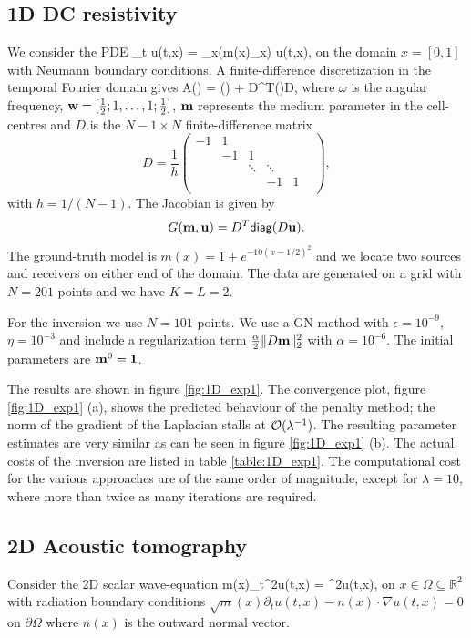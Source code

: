 \documentclass{iopart}
\begin{document}
\subsection{1D DC resistivity}
We consider the PDE
\bq
\partial_t u(t,x) = \partial_x\left(m(x)\partial_x\right) u(t,x),
\eq
on the domain $x = [0,1]$ with Neumann boundary conditions. 
A finite-difference discretization in the temporal Fourier domain gives
\bq
A() = \imath\omega{}() + D^T()D,
\eq
where $\omega$ is the angular frequency, $\mathbf{w} = [\frac{1}{2}; 1, \ldots, 1; \frac{1}{2}]$, $\mathbf{m}$ represents 
the medium parameter in the cell-centres and $D$ is the $N-1\times N$ finite-difference matrix
\[
D=\frac{1}{h}\left(\begin{array}{cccccc} 
-1& 1&   &  &      &   \\
  &-1& 1 &  &      &   \\
  &  &\ddots&\ddots&   \\
  &  &      & -1   & 1 \\
\end{array}\right),
\]
with $h=1/(N-1)$. The Jacobian is given by 
\[
G(\mathbf{m},\mathbf{u}) = D^T\mathsf{diag}(D\mathbf{u}).
\]
The ground-truth model is $m(x) = 1+e^{-10(x-1/2)^2}$ and we locate two sources and receivers on either end of the domain. The data are generated on a grid with $N=201$ points and we have $K=L=2$.

For the inversion we use $N=101$ points.
We use a GN method with $\epsilon=10^{-9}$, $\eta=10^{-3}$ and include a regularization term $\frac{\alpha}{2} \|D\mathbf{m}\|_2^2$ with $\alpha = 10^{-6}$.
The initial parameters are $\mathbf{m}^0 = \mathbf{1}$.

The results are shown in figure \ref{fig:1D_exp1}. The convergence plot, figure \ref{fig:1D_exp1} (a), shows the predicted behaviour of the penalty method; the norm
of the gradient of the Laplacian stalls at $\mathcal{O}(\lambda^{-1})$. The resulting parameter estimates are very similar as can be seen 
in figure \ref{fig:1D_exp1} (b). The actual costs of the inversion are listed in table \ref{table:1D_exp1}. The computational cost for the various approaches are of the same order of magnitude, except for $\lambda=10$, where more than twice as many iterations are required. 

\subsection{2D Acoustic tomography}
Consider the 2D scalar wave-equation
\bq
m(x)\partial_t^2u(t,x) = \nabla^2u(t,x),
\eq
on $x \in \Omega \subseteq \mathbb{R}^2$  with radiation boundary conditions $\sqrt{m}(x)\partial_tu(t,x) - n(x)\cdot\nabla u(t,x) = 0$ on $\partial\Omega$
where $n(x)$ is the outward normal vector. 
\end{document}
